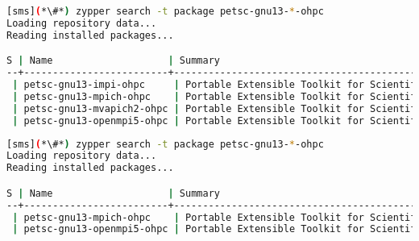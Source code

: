 \begin{lstlisting}[language=bash,keepspaces=true,keywords={}]
[sms](*\#*) zypper search -t package petsc-gnu13-*-ohpc
Loading repository data...
Reading installed packages...

S | Name                    | Summary
--+-------------------------+--------------------------------------------------------+--------
 | petsc-gnu13-impi-ohpc     | Portable Extensible Toolkit for Scientific Computation | package
 | petsc-gnu13-mpich-ohpc    | Portable Extensible Toolkit for Scientific Computation | package
 | petsc-gnu13-mvapich2-ohpc | Portable Extensible Toolkit for Scientific Computation | package
 | petsc-gnu13-openmpi5-ohpc | Portable Extensible Toolkit for Scientific Computation | package
\end{lstlisting}
\fi

\begin{lstlisting}[language=bash,keepspaces=true,keywords={}]
[sms](*\#*) zypper search -t package petsc-gnu13-*-ohpc
Loading repository data...
Reading installed packages...

S | Name                    | Summary
--+-------------------------+--------------------------------------------------------+--------
 | petsc-gnu13-mpich-ohpc    | Portable Extensible Toolkit for Scientific Computation | package
 | petsc-gnu13-openmpi5-ohpc | Portable Extensible Toolkit for Scientific Computation | package
\end{lstlisting}
\fi


